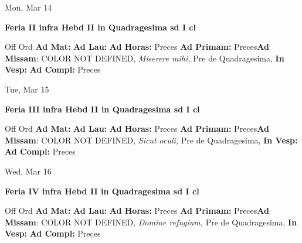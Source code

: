 \documentclass[10pt]{book}
\begin{document}
\begin{center}
\begin{minipage}{3.5in}
\vspace{2em}
\begin{center}Mon, Mar 14
\end{center}
\textbf{ \large Feria II infra Hebd II in Quadragesima
\textnormal{\normalsize sd I cl}}

\begin{justify}Off Ord
\textbf{Ad Mat: }
\textbf{Ad Lau: }
\textbf{Ad Horas: }Preces
\textbf{Ad Primam: }Preces\textbf{Ad Missam}: COLOR NOT DEFINED, \textit{Miserere mihi,} Pre de Quadragesima, 
\textbf{In Vesp: }
\textbf{Ad Compl: }Preces
\end{justify}
\end{minipage}
\end{center}

\begin{center}
\begin{minipage}{3.5in}
\vspace{2em}
\begin{center}Tue, Mar 15
\end{center}
\textbf{ \large Feria III infra Hebd II in Quadragesima
\textnormal{\normalsize sd I cl}}

\begin{justify}Off Ord
\textbf{Ad Mat: }
\textbf{Ad Lau: }
\textbf{Ad Horas: }Preces
\textbf{Ad Primam: }Preces\textbf{Ad Missam}: COLOR NOT DEFINED, \textit{Sicut oculi,} Pre de Quadragesima, 
\textbf{In Vesp: }
\textbf{Ad Compl: }Preces
\end{justify}
\end{minipage}
\end{center}

\begin{center}
\begin{minipage}{3.5in}
\vspace{2em}
\begin{center}Wed, Mar 16
\end{center}
\textbf{ \large Feria IV infra Hebd II in Quadragesima
\textnormal{\normalsize sd I cl}}

\begin{justify}Off Ord
\textbf{Ad Mat: }
\textbf{Ad Lau: }
\textbf{Ad Horas: }Preces
\textbf{Ad Primam: }Preces\textbf{Ad Missam}: COLOR NOT DEFINED, \textit{Domine refugium,} Pre de Quadragesima, 
\textbf{In Vesp: }
\textbf{Ad Compl: }Preces
\end{justify}
\end{minipage}
\end{center}
\end{document}
